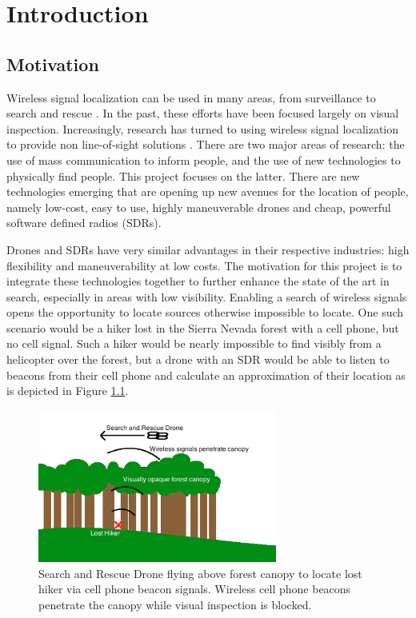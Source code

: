 \chapter{Introduction}

\section{Motivation}
Wireless signal localization can be used in many areas, from surveillance to search and rescue \cite{wireless_loc}. In the past, these efforts have been focused largely on visual inspection. Increasingly, research has turned to using wireless signal localization to provide non line-of-sight solutions \cite{wireless_loc}. There are two major areas of research: the use of mass communication to inform people, and the use of new technologies to physically find people. This project focuses on the latter. There are new technologies emerging that are opening up new avenues for the location of people, namely low-cost, easy to use, highly maneuverable drones and cheap, powerful software defined radios (SDRs). \par
Drones and SDRs have very similar advantages in their respective industries: high flexibility and maneuverability at low costs. The motivation for this project is to integrate these technologies together to further enhance the state of the art in search, especially in areas with low visibility. Enabling a search of wireless signals opens the opportunity to locate sources otherwise impossible to locate. One such scenario would be a hiker lost in the Sierra Nevada forest with a cell phone, but no cell signal. Such a hiker would be nearly impossible to find visibly from a helicopter over the forest, but a drone with an SDR would be able to listen to beacons from their cell phone and calculate an approximation of their location as is depicted in Figure \ref{fig:sar_drone_forest}. \par
\begin{figure}[h!]
\centering
\includegraphics[width=0.70\textwidth]{img/sar_drone_forest}
\caption{Search and Rescue Drone flying above forest canopy to locate lost hiker via cell phone beacon signals. Wireless cell phone beacons penetrate the canopy while visual inspection is blocked.}
\label{fig:sar_drone_forest}
\end{figure}
